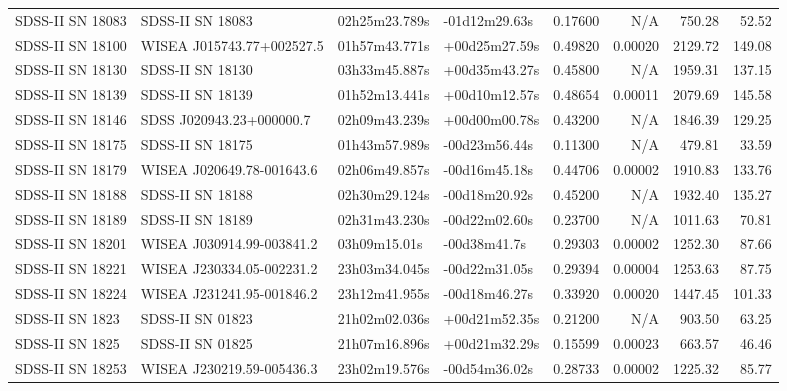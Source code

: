 \begin{longtable}{llllrrrr}
SDSS-II SN 18083 &                SDSS-II SN 18083 &   02h25m23.789s &   -01d12m29.63s &  0.17600 &      N/A &   750.28 &       52.52 \\
SDSS-II SN 18100 &       WISEA J015743.77+002527.5 &   01h57m43.771s &   +00d25m27.59s &  0.49820 &  0.00020 &  2129.72 &      149.08 \\
SDSS-II SN 18130 &                SDSS-II SN 18130 &   03h33m45.887s &   +00d35m43.27s &  0.45800 &      N/A &  1959.31 &      137.15 \\
SDSS-II SN 18139 &                SDSS-II SN 18139 &   01h52m13.441s &   +00d10m12.57s &  0.48654 &  0.00011 &  2079.69 &      145.58 \\
SDSS-II SN 18146 &        SDSS J020943.23+000000.7 &   02h09m43.239s &   +00d00m00.78s &  0.43200 &      N/A &  1846.39 &      129.25 \\
SDSS-II SN 18175 &                SDSS-II SN 18175 &   01h43m57.989s &   -00d23m56.44s &  0.11300 &      N/A &   479.81 &       33.59 \\
SDSS-II SN 18179 &       WISEA J020649.78-001643.6 &   02h06m49.857s &   -00d16m45.18s &  0.44706 &  0.00002 &  1910.83 &      133.76 \\
SDSS-II SN 18188 &                SDSS-II SN 18188 &   02h30m29.124s &   -00d18m20.92s &  0.45200 &      N/A &  1932.40 &      135.27 \\
SDSS-II SN 18189 &                SDSS-II SN 18189 &   02h31m43.230s &   -00d22m02.60s &  0.23700 &      N/A &  1011.63 &       70.81 \\
SDSS-II SN 18201 &       WISEA J030914.99-003841.2 &    03h09m15.01s &    -00d38m41.7s &  0.29303 &  0.00002 &  1252.30 &       87.66 \\
SDSS-II SN 18221 &       WISEA J230334.05-002231.2 &   23h03m34.045s &   -00d22m31.05s &  0.29394 &  0.00004 &  1253.63 &       87.75 \\
SDSS-II SN 18224 &       WISEA J231241.95-001846.2 &   23h12m41.955s &   -00d18m46.27s &  0.33920 &  0.00020 &  1447.45 &      101.33 \\
SDSS-II SN 1823  &                SDSS-II SN 01823 &   21h02m02.036s &   +00d21m52.35s &  0.21200 &      N/A &   903.50 &       63.25 \\
SDSS-II SN 1825  &                SDSS-II SN 01825 &   21h07m16.896s &   +00d21m32.29s &  0.15599 &  0.00023 &   663.57 &       46.46 \\
SDSS-II SN 18253 &       WISEA J230219.59-005436.3 &   23h02m19.576s &   -00d54m36.02s &  0.28733 &  0.00002 &  1225.32 &       85.77 \\

\end{longtable}
